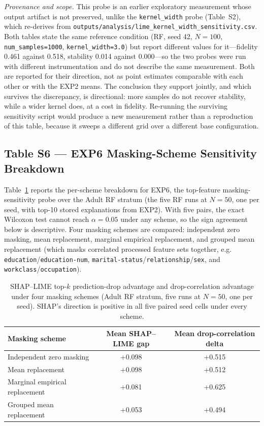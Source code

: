 \documentclass[11pt]{article}
\begin{document}
\noindent\textit{Provenance and scope.} This probe is an earlier exploratory
measurement whose output artifact is not preserved, unlike the
\texttt{kernel\_width} probe (Table~S2), which re-derives from
\texttt{outputs/analysis/lime\_kernel\_width\_sensitivity.csv}. Both tables
state the same reference condition (RF, seed 42, $N=100$,
\texttt{num\_samples=1000}, \texttt{kernel\_width=3.0}) but report different
values for it---fidelity 0.461 against 0.518, stability 0.014 against
0.000---so the two probes were run with different instrumentation and do not
describe the same measurement. Both are reported for their direction, not as
point estimates comparable with each other or with the EXP2 means. The
conclusion they support jointly, and which survives the discrepancy, is
directional: more samples do not recover stability, while a wider kernel
does, at a cost in fidelity. Re-running the surviving sensitivity script
would produce a new measurement rather than a reproduction of this table,
because it sweeps a different grid over a different base configuration.

\subsection*{Table S6 --- EXP6 Masking-Scheme Sensitivity Breakdown}
\label{sec:supp_exp6}

Table~\ref{tab:s6_exp6} reports the per-scheme breakdown for EXP6, the
top-feature masking-sensitivity probe over the Adult RF stratum (the five
RF runs at $N=50$, one per seed, with top-10 stored explanations from
EXP2). With five pairs, the exact Wilcoxon test cannot reach
$\alpha = 0.05$ under any scheme, so the sign agreement below is
descriptive. Four masking
schemes are compared: independent zero masking, mean replacement,
marginal empirical replacement, and grouped mean replacement (which masks
correlated processed feature sets together, e.g.
\texttt{education}/\texttt{education-num},
\texttt{marital-status}/\texttt{relationship}/\texttt{sex}, and
\texttt{workclass}/\texttt{occupation}).

\begin{table}[h]
\centering
\caption{SHAP--LIME top-$k$ prediction-drop advantage and drop-correlation
advantage under four masking schemes (Adult RF stratum, five runs at $N=50$,
one per seed). SHAP's direction is positive in all five paired seed cells under
every scheme.}
\label{tab:s6_exp6}
\begin{tabular}{lcc}
\toprule
Masking scheme & Mean SHAP--LIME gap & Mean drop-correlation delta \\
\midrule
Independent zero masking      & +0.098 & +0.515 \\
Mean replacement               & +0.098 & +0.512 \\
Marginal empirical replacement & +0.081 & +0.625 \\
Grouped mean replacement       & +0.053 & +0.494 \\
\bottomrule
\end{tabular}
\end{table}
\end{document}
